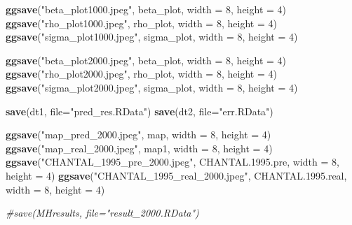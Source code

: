 \documentclass[]{article}
\newenvironment{Shaded}{\begin{snugshade}}{\end{snugshade}}
\newcommand{\CommentTok}[1]{\textcolor[rgb]{0.56,0.35,0.01}{\textit{#1}}}
\newcommand{\DataTypeTok}[1]{\textcolor[rgb]{0.13,0.29,0.53}{#1}}
\newcommand{\DecValTok}[1]{\textcolor[rgb]{0.00,0.00,0.81}{#1}}
\newcommand{\FloatTok}[1]{\textcolor[rgb]{0.00,0.00,0.81}{#1}}
\newcommand{\KeywordTok}[1]{\textcolor[rgb]{0.13,0.29,0.53}{\textbf{#1}}}
\newcommand{\NormalTok}[1]{#1}
\newcommand{\StringTok}[1]{\textcolor[rgb]{0.31,0.60,0.02}{#1}}
\begin{document}
\begin{Shaded}
\begin{Highlighting}[]
\KeywordTok{ggsave}\NormalTok{(}\StringTok{"beta_plot1000.jpeg"}\NormalTok{, beta_plot, }\DataTypeTok{width =} \DecValTok{8}\NormalTok{, }\DataTypeTok{height =} \DecValTok{4}\NormalTok{)}
\KeywordTok{ggsave}\NormalTok{(}\StringTok{"rho_plot1000.jpeg"}\NormalTok{, rho_plot, }\DataTypeTok{width =} \DecValTok{8}\NormalTok{, }\DataTypeTok{height =} \DecValTok{4}\NormalTok{)}
\KeywordTok{ggsave}\NormalTok{(}\StringTok{"sigma_plot1000.jpeg"}\NormalTok{, sigma_plot, }\DataTypeTok{width =} \DecValTok{8}\NormalTok{, }\DataTypeTok{height =} \DecValTok{4}\NormalTok{)}

\KeywordTok{ggsave}\NormalTok{(}\StringTok{"beta_plot2000.jpeg"}\NormalTok{, beta_plot, }\DataTypeTok{width =} \DecValTok{8}\NormalTok{, }\DataTypeTok{height =} \DecValTok{4}\NormalTok{)}
\KeywordTok{ggsave}\NormalTok{(}\StringTok{"rho_plot2000.jpeg"}\NormalTok{, rho_plot, }\DataTypeTok{width =} \DecValTok{8}\NormalTok{, }\DataTypeTok{height =} \DecValTok{4}\NormalTok{)}
\KeywordTok{ggsave}\NormalTok{(}\StringTok{"sigma_plot2000.jpeg"}\NormalTok{, sigma_plot, }\DataTypeTok{width =} \DecValTok{8}\NormalTok{, }\DataTypeTok{height =} \DecValTok{4}\NormalTok{)}


\KeywordTok{save}\NormalTok{(dt1, }\DataTypeTok{file=}\StringTok{"pred_res.RData"}\NormalTok{)}
\KeywordTok{save}\NormalTok{(dt2, }\DataTypeTok{file=}\StringTok{"err.RData"}\NormalTok{)}

\KeywordTok{ggsave}\NormalTok{(}\StringTok{"map_pred_2000.jpeg"}\NormalTok{, map, }\DataTypeTok{width =} \DecValTok{8}\NormalTok{, }\DataTypeTok{height =} \DecValTok{4}\NormalTok{)}
\KeywordTok{ggsave}\NormalTok{(}\StringTok{"map_real_2000.jpeg"}\NormalTok{, map1, }\DataTypeTok{width =} \DecValTok{8}\NormalTok{, }\DataTypeTok{height =} \DecValTok{4}\NormalTok{)}
\KeywordTok{ggsave}\NormalTok{(}\StringTok{"CHANTAL_1995_pre_2000.jpeg"}\NormalTok{, CHANTAL.}\FloatTok{1995.}\NormalTok{pre, }\DataTypeTok{width =} \DecValTok{8}\NormalTok{, }\DataTypeTok{height =} \DecValTok{4}\NormalTok{)}
\KeywordTok{ggsave}\NormalTok{(}\StringTok{"CHANTAL_1995_real_2000.jpeg"}\NormalTok{, CHANTAL.}\FloatTok{1995.}\NormalTok{real, }\DataTypeTok{width =} \DecValTok{8}\NormalTok{, }\DataTypeTok{height =} \DecValTok{4}\NormalTok{)}

\CommentTok{#save(MHresults, file="result_2000.RData")}
\end{Highlighting}
\end{Shaded}
\end{document}
